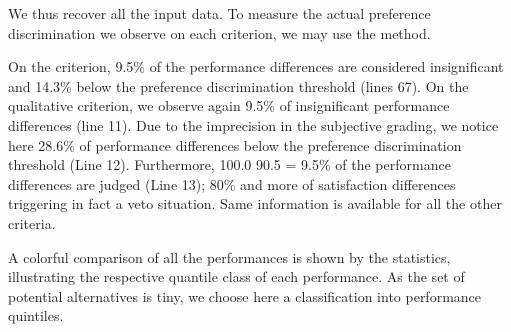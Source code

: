 \documentclass[a4paper,12pt,english]{sphinxhowto}
\begin{document}
We thus recover all the input data. To measure the actual preference discrimination we observe on each criterion, we may use the  method.

\begin{sphinxVerbatim}[commandchars=\\\{\},numbers=left,firstnumber=1,stepnumber=1]
\end{sphinxVerbatim}

On the  criterion, 9.5\% of the performance differences are considered insignificant and 14.3\% below the preference discrimination threshold (lines 6\sphinxhyphen{}7). On the qualitative  criterion, we observe again 9.5\% of insignificant performance differences (line 11). Due to the imprecision in the subjective grading, we notice here 28.6\% of performance differences below the preference discrimination threshold (Line 12). Furthermore, 100.0 \sphinxhyphen{} 90.5 = 9.5\% of the performance differences are judged  (Line 13); 80\% and more of satisfaction differences triggering in fact a veto situation. Same information is available for all the other criteria.

A colorful comparison of all the performances is shown by the  statistics, illustrating the respective quantile class of each performance. As the set of potential alternatives is tiny, we choose here a classification into performance quintiles.

\begin{sphinxVerbatim}[commandchars=\\\{\}]
\end{sphinxVerbatim}
\end{document}
